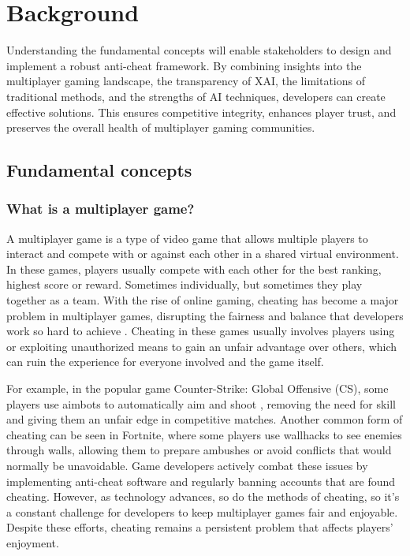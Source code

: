 \section{Background}
\label{ch:background}

Understanding the fundamental concepts will enable stakeholders to design and implement a robust anti-cheat framework. By combining insights into the multiplayer gaming landscape, the transparency of XAI, the limitations of traditional methods, and the strengths of AI techniques, developers can create effective solutions. This ensures competitive integrity, enhances player trust, and preserves the overall health of multiplayer gaming communities.

\subsection{Fundamental concepts}

\subsubsection{What is a multiplayer game?}

A multiplayer game is a type of video game that allows multiple players to interact and compete with or against each other in a shared virtual environment. In these games, players usually compete with each other for the best ranking, highest score or reward. Sometimes individually, but sometimes they play together as a team. With the rise of online gaming, cheating has become a major problem in multiplayer games, disrupting the fairness and balance that developers work so hard to achieve \cite{s213241245}. Cheating in these games usually involves players using or exploiting unauthorized means to gain an unfair advantage over others, which can ruin the experience for everyone involved and the game itself.

For example, in the popular game Counter-Strike: Global Offensive (CS), some players use aimbots to automatically aim and shoot \cite{291120}, removing the need for skill and giving them an unfair edge in competitive matches. Another common form of cheating can be seen in Fortnite, where some players use wallhacks \cite{10.1145/3372297.3417890} to see enemies through walls, allowing them to prepare ambushes or avoid conflicts that would normally be unavoidable. Game developers actively combat these issues by implementing anti-cheat software and regularly banning accounts that are found cheating. However, as technology advances, so do the methods of cheating, so it's a constant challenge for developers to keep multiplayer games fair and enjoyable. Despite these efforts, cheating remains a persistent problem that affects players' enjoyment.

